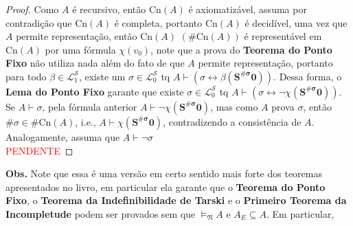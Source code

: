 \documentclass[11pt]{article}
\newcommand{\mc}[1]{\mathcal{#1}}
\newcommand{\mf}[1]{\mathfrak{#1}}
\begin{document}
\begin{proof}
    Como $A$ é recursivo, então $\text{Cn}(A)$ é axiomatizável, assuma por contradição que $\text{Cn}(A)$ é completa, portanto $\text{Cn}(A)$ é decidível, uma vez que $A$ permite representação, então $\text{Cn}(A)$ $(\#\text{Cn}(A))$ é representável em $\text{Cn}(A)$ por uma fórmula $\chi(v_0)$, note que a prova do \textbf{Teorema do Ponto Fixo} não utiliza nada além do fato de que $A$ permite representação, portanto para todo $\beta\in\mc{L}_1^\mc{S}$, existe um $\sigma\in\mc{L}_0^\mc{S}$ tq $A\vdash(\sigma\leftrightarrow\beta(\mathbf{S^{\#\sigma}0}))$. Dessa forma, o \textbf{Lema do Ponto Fixo} garante que existe $\sigma\in\mc{L}_0^\mc{S}$ tq $A\vdash(\sigma\leftrightarrow\neg\chi(\mathbf{S^{\#\sigma}0}))$. Se $A\vdash\sigma$, pela fórmula anterior $A\vdash\neg\chi(\mathbf{S^{\#\sigma}0})$, mas como $A$ prova $\sigma$, então $\#\sigma\in\#\text{Cn}(A)$, i.e., $A\vdash\chi(\mathbf{S^{\#\sigma}0})$, contradizendo a consistência de $A$. Analogamente, assuma que $A\vdash\neg\sigma$
    \\\textcolor{red}{PENDENTE}
\end{proof}

\begin{shaded}
\textbf{Obs.} Note que essa é uma versão em certo sentido mais forte dos teoremas apresentados no livro, em particular ela garante que o \textbf{Teorema do Ponto Fixo}, o \textbf{Teorema da Indefinibilidade de Tarski} e o \textbf{Primeiro Teorema da Incompletude} podem ser provados sem que $\vDash_\mf{N}A$ e $A_E\subseteq A$. Em particular, 
\end{shaded}
\end{document}
